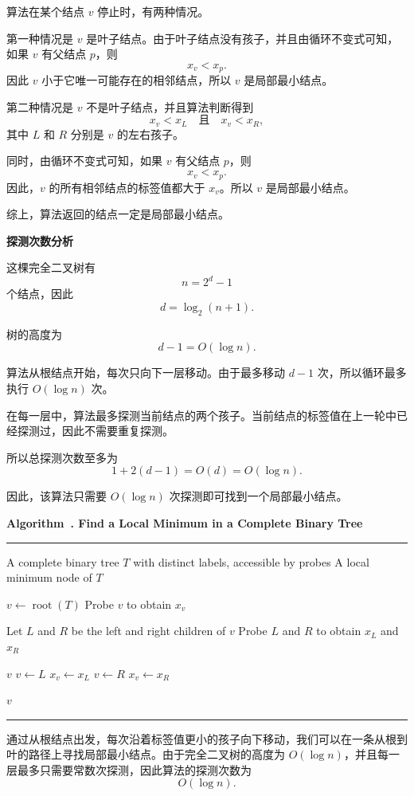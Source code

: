 \documentclass[12pt,a4paper]{article}
\newenvironment{breakablealgorithm}[1]{%
  \par\addvspace{1em}
  \refstepcounter{algorithm}%
  \noindent\textbf{Algorithm~\thealgorithm. #1}\par\nobreak
  \noindent\rule{\linewidth}{0.4pt}\par\nobreak
  \vspace{0.4em}
}{%
  \par\vspace{0.2em}
  \noindent\rule{\linewidth}{0.4pt}
  \par\addvspace{1em}
}
\begin{document}
\begin{answerbox}
算法在某个结点 $v$ 停止时，有两种情况。

第一种情况是 $v$ 是叶子结点。由于叶子结点没有孩子，并且由循环不变式可知，如果 $v$ 有父结点 $p$，则
\[
x_v < x_p.
\]
因此 $v$ 小于它唯一可能存在的相邻结点，所以 $v$ 是局部最小结点。

第二种情况是 $v$ 不是叶子结点，并且算法判断得到
\[
x_v < x_L
\quad \text{且} \quad
x_v < x_R,
\]
其中 $L$ 和 $R$ 分别是 $v$ 的左右孩子。

同时，由循环不变式可知，如果 $v$ 有父结点 $p$，则
\[
x_v < x_p.
\]
因此，$v$ 的所有相邻结点的标签值都大于 $x_v$。所以 $v$ 是局部最小结点。

综上，算法返回的结点一定是局部最小结点。

\textbf{探测次数分析}

这棵完全二叉树有
\[
n = 2^d - 1
\]
个结点，因此
\[
d = \log_2(n+1).
\]

树的高度为
\[
d-1 = O(\log n).
\]

算法从根结点开始，每次只向下一层移动。由于最多移动 $d-1$ 次，所以循环最多执行 $O(\log n)$ 次。

在每一层中，算法最多探测当前结点的两个孩子。当前结点的标签值在上一轮中已经探测过，因此不需要重复探测。

所以总探测次数至多为
\[
1 + 2(d-1) = O(d) = O(\log n).
\]

因此，该算法只需要 $O(\log n)$ 次探测即可找到一个局部最小结点。


\begin{breakablealgorithm}{Find a Local Minimum in a Complete Binary Tree}
\begin{algorithmic}[1]
\Require A complete binary tree $T$ with distinct labels, accessible by probes
\Ensure A local minimum node of $T$

\State $v \gets \operatorname{root}(T)$
\State Probe $v$ to obtain $x_v$

    \State Let $L$ and $R$ be the left and right children of $v$
    \State Probe $L$ and $R$ to obtain $x_L$ and $x_R$

        \State \Return $v$
        \State $v \gets L$
        \State $x_v \gets x_L$
    \Else
        \State $v \gets R$
        \State $x_v \gets x_R$
    \EndIf
\EndWhile

\State \Return $v$
\end{algorithmic}
\end{breakablealgorithm}

通过从根结点出发，每次沿着标签值更小的孩子向下移动，我们可以在一条从根到叶的路径上寻找局部最小结点。由于完全二叉树的高度为 $O(\log n)$，并且每一层最多只需要常数次探测，因此算法的探测次数为
\[
O(\log n).
\]
\end{answerbox}
\end{document}
